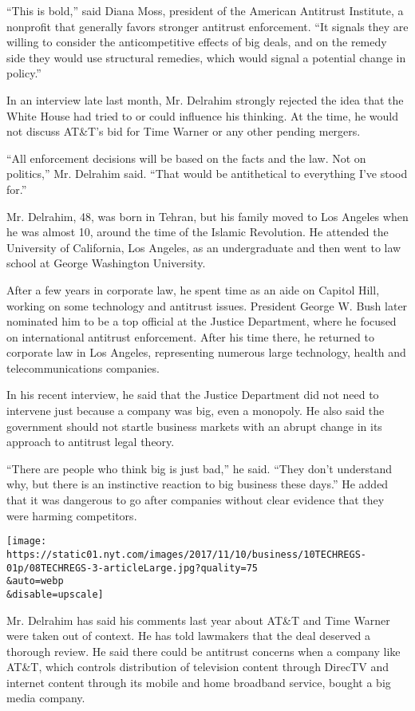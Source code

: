 ``This is bold,'' said Diana Moss, president of the American Antitrust
Institute, a nonprofit that generally favors stronger antitrust
enforcement. ``It signals they are willing to consider the
anticompetitive effects of big deals, and on the remedy side they would
use structural remedies, which would signal a potential change in
policy.''

In an interview late last month, Mr. Delrahim strongly rejected the idea
that the White House had tried to or could influence his thinking. At
the time, he would not discuss AT\&T's bid for Time Warner or any other
pending mergers.

``All enforcement decisions will be based on the facts and the law. Not
on politics,'' Mr. Delrahim said. ``That would be antithetical to
everything I've stood for.''

Mr. Delrahim, 48, was born in Tehran, but his family moved to Los
Angeles when he was almost 10, around the time of the Islamic
Revolution. He attended the University of California, Los Angeles, as an
undergraduate and then went to law school at George Washington
University.

After a few years in corporate law, he spent time as an aide on Capitol
Hill, working on some technology and antitrust issues. President George
W. Bush later nominated him to be a top official at the Justice
Department, where he focused on international antitrust enforcement.
After his time there, he returned to corporate law in Los Angeles,
representing numerous large technology, health and telecommunications
companies.

In his recent interview, he said that the Justice Department did not
need to intervene just because a company was big, even a monopoly. He
also said the government should not startle business markets with an
abrupt change in its approach to antitrust legal theory.

``There are people who think big is just bad,'' he said. ``They don't
understand why, but there is an instinctive reaction to big business
these days.'' He added that it was dangerous to go after companies
without clear evidence that they were harming competitors.

\texttt{[image: https://static01.nyt.com/images/2017/11/10/business/10TECHREGS-01p/08TECHREGS-3-articleLarge.jpg?quality=75\\\&auto=webp\\\&disable=upscale]}

Mr. Delrahim has said his comments last year about AT\&T and Time Warner
were taken out of context. He has told lawmakers that the deal deserved
a thorough review. He said there could be antitrust concerns when a
company like AT\&T, which controls distribution of television content
through DirecTV and internet content through its mobile and home
broadband service, bought a big media company.

